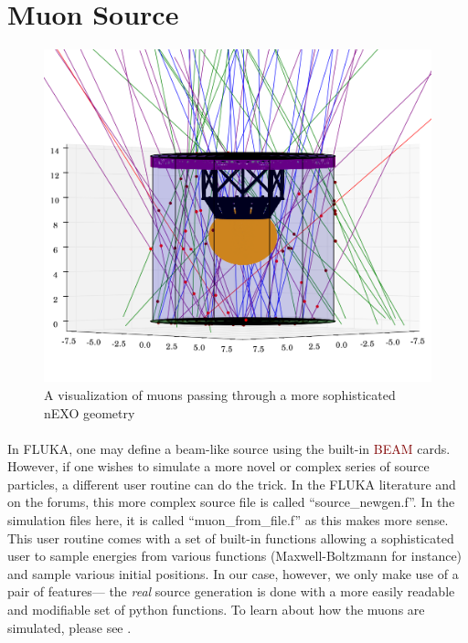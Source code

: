 \section{Muon Source}

\begin{figure}[h]
    \begin{center}
    \includegraphics[scale=0.3]{figures/muons_1.png}
    \caption{A visualization of muons passing through a more sophisticated nEXO geometry}
    \label{fig:muons_1}
    \end{center}
\end{figure}

\paragraph{}
In FLUKA, one may define a beam-like source using the built-in \textcolor{Maroon}{BEAM} cards. However, if one wishes to simulate a more novel or complex series of source particles, a different user routine can do the trick. In the FLUKA literature and on the forums, this more complex source file is called ``source\_newgen.f''. In the simulation files here, it is called ``muon\_from\_file.f'' as this makes more sense. This user routine comes with a set of built-in functions allowing a sophisticated user to sample energies from various functions (Maxwell-Boltzmann for instance) and sample various initial positions. In our case, however, we only make use of a pair of features— the \textit{real} source generation is done with a more easily readable and modifiable set of python functions. To learn about how the muons are simulated, please see \cite{rross_muon_technote}.

